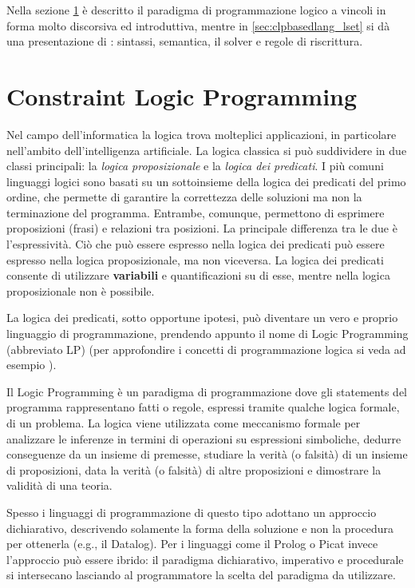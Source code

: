 \documentclass[12pt,a4paper,openright]{book} %
\begin{document}
Nella sezione \ref{sec:clpbasedlang_clp} è descritto il paradigma di
programmazione logico a vincoli in forma molto discorsiva ed
introduttiva, mentre in \ref{sec:clpbasedlang_lset} si dà una
presentazione di \lset{}: sintassi, semantica, il solver e regole di
riscrittura.

\section{Constraint Logic Programming}
\label{sec:clpbasedlang_clp}

Nel campo dell'informatica la logica trova molteplici applicazioni, in
particolare nell'ambito dell'intelligenza artificiale. La logica
classica si può suddividere in due classi principali: la \emph{logica
  proposizionale} e la \emph{logica dei predicati}.  I più comuni
linguaggi logici sono basati su un sottoinsieme della logica dei
predicati del primo ordine, che permette di garantire la correttezza
delle soluzioni ma non la terminazione del programma. Entrambe,
comunque, permettono di esprimere proposizioni (frasi) e relazioni tra
posizioni. La principale differenza tra le due è l'espressività. Ciò
che può essere espresso nella logica dei predicati può essere espresso
nella logica proposizionale, ma non viceversa. La logica dei predicati
consente di utilizzare \textbf{variabili} e quantificazioni su di
esse, mentre nella logica proposizionale non è possibile.

La logica dei predicati, sotto opportune ipotesi, può diventare un
vero e proprio linguaggio di programmazione, prendendo appunto il nome
di Logic Programming (abbreviato LP) (per approfondire i concetti di
programmazione logica si veda ad esempio \cite{Console97}).

Il Logic Programming è un paradigma di programmazione dove gli
statements del programma rappresentano fatti o regole, espressi
tramite qualche logica formale, di un problema. La logica viene
utilizzata come meccanismo formale per analizzare le inferenze in
termini di operazioni su espressioni simboliche, dedurre conseguenze
da un insieme di premesse, studiare la verità (o falsità) di un
insieme di proposizioni, data la verità (o falsità) di altre
proposizioni e dimostrare la validità di una teoria.

Spesso i linguaggi di programmazione di questo tipo adottano un
approccio dichiarativo, descrivendo solamente la forma della soluzione
e non la procedura per ottenerla (e.g., il Datalog). Per i linguaggi
come il Prolog o Picat invece l'approccio può essere ibrido: il
paradigma dichiarativo, imperativo e procedurale si intersecano
lasciando al programmatore la scelta del paradigma da utilizzare.
\end{document}

